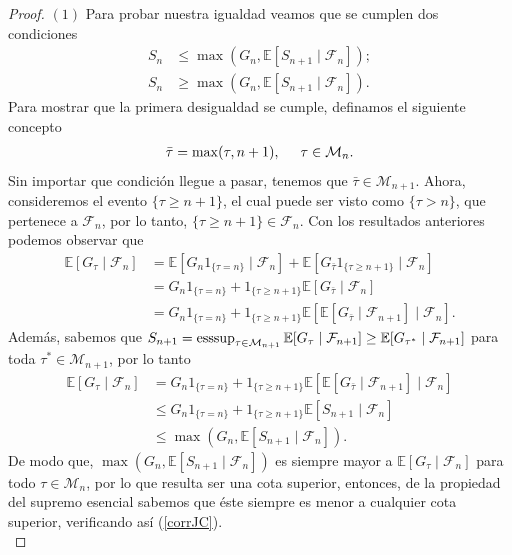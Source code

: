 \begin{proof}
$(1)$ Para probar nuestra igualdad veamos que se cumplen dos condiciones
	\begin{align}
	S_n & \leq \max (G_n, \mathbb{E}[S_{n+1} \mid \mathcal{F}_n]);  \label{corrJC} \\
	S_n & \geq \max (G_n, \mathbb{E}[S_{n+1} \mid \mathcal{F}_n]). \label{corrJC2}
	\end{align}
Para mostrar que la primera desigualdad se cumple, definamos el siguiente concepto
	\begin{align*}
	\bar{\tau} = \max(\tau, n+1), \hspace{0.5cm} \tau \in \mathcal{M}_n.
	\end{align*}
Sin importar que condición llegue a pasar, tenemos que $\bar{\tau} \in \mathcal{M}_{n+1}$. Ahora, consideremos el evento $\{\tau \geq n+1\}$, el cual puede ser visto como $\{\tau > n\}$, que pertenece a $\mathcal{F}_n$, por lo tanto, $\{\tau \geq n+1\} \in \mathcal{F}_n$. Con los resultados anteriores podemos observar que
	\begin{align*}
	\mathbb{E}[G_\tau \mid \mathcal{F}_n] & = \mathbb{E}[G_n 1_{\{\tau = n\}} \mid \mathcal{F}_n] + \mathbb{E}[G_{\bar{\tau}} 1_{\{\tau \geq n+1\}} \mid \mathcal{F}_n] \\
	& = G_n 1_{\{\tau = n\}} + 1_{\{\tau \geq n+1\}}  \mathbb{E}[G_{\bar{\tau}} \mid \mathcal{F}_n] \\
	& = G_n 1_{\{\tau = n\}} + 1_{\{\tau \geq n+1\}}  \mathbb{E}[ \mathbb{E} [G_{\bar{\tau}} \mid \mathcal{F}_{n+1}] \mid \mathcal{F}_n].
	\end{align*}
Además, sabemos que $S_{n+1} = \operatorname*{esssup}_{\tau \in \mathcal{M}_{n+1}} \mathbb{E}[G_\tau \mid \mathcal{F}_{n+1}] \geq \mathbb{E}[G_{\tau^{*}} \mid \mathcal{F}_{n+1}]$ para toda $\tau^{*} \in \mathcal{M}_{n+1}$, por lo tanto
	\begin{align*}
	\mathbb{E}[G_\tau \mid \mathcal{F}_n] & = G_n 1_{\{\tau = n\}} + 1_{\{\tau \geq n+1\}}  \mathbb{E}[ \mathbb{E} [G_{\bar{\tau}} \mid \mathcal{F}_{n+1}] \mid \mathcal{F}_n] \\
	& \leq G_n 1_{\{\tau = n\}} + 1_{\{\tau \geq n+1\}}  \mathbb{E}[ S_{n+1} \mid \mathcal{F}_n] \\ 
	& \leq \max (G_n, \mathbb{E}[S_{n+1} \mid \mathcal{F}_n]).
	\end{align*}
De modo que,  $\max (G_n, \mathbb{E}[S_{n+1} \mid \mathcal{F}_n])$ es siempre mayor a $\mathbb{E}[G_\tau \mid \mathcal{F}_n]$ para todo $\tau \in \mathcal{M}_n$, por lo que resulta ser una cota superior, entonces, de la propiedad del supremo esencial sabemos que éste siempre es menor a cualquier cota superior, verificando así (\ref{corrJC}). \\


\end{proof}
